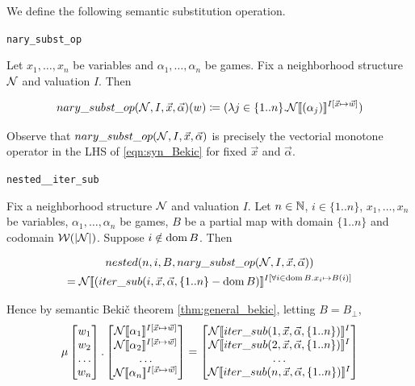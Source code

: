 We define the following semantic substitution operation.

\begin{bdefinition}
\texttt{nary\_subst\_op}

Let $x_1,\dots,x_n$ be variables and $\alpha_1,\dots,\alpha_n$ be \rlGL{} games. Fix a neighborhood structure $\mathcal N$ and valuation $I$. Then

    \[nary\_subst\_op(\mathcal N,I,\vec{x},\vec{\alpha})(w) \coloneq (\lambda j\in\{1..n\}. \mathcal N[\![(\alpha_j)]\!]^{I[\vec{x}\mapsto \vec{w}]})\]
\end{bdefinition}

Observe that $nary\_subst\_op(\mathcal N,I,\vec{x},\vec{\alpha})$ is precisely the vectorial monotone operator in the LHS of \autoref{eqn:syn_Bekic} for fixed $\vec{x}$ and $\vec{\alpha}$.


\begin{btheorem}
\label{thm:nested__iter_sub}
\texttt{nested\_\_iter\_sub}

Fix a neighborhood structure $\mathcal N$ and valuation $I$. Let $n\in \mathbb{N}$, $i\in\{1..n\}$, $x_1,\dots,x_n$ be variables, $\alpha_1,\dots,\alpha_n$ be \rlGL{} games, $B$ be a partial map with domain $\{1..n\}$ and codomain $\mathcal W(|\mathcal N|)$. Suppose $i\notin \operatorname{dom} B$. Then

\begin{multline}
    nested (n,i,B,nary\_subst\_op(\mathcal N,I,\vec{x},\vec{\alpha})) \\
 = \mathcal N [\![(iter\_sub(i,\vec{x},\vec{\alpha},\{1..n\}-\operatorname{dom} B)]\!]^{I[\forall i \in \operatorname{dom} B. x_i\mapsto B(i) ]}
\end{multline}

Hence by semantic Beki\v{c} theorem \autoref{thm:general_bekic}, letting $B=B_\bot$,
\begin{equation}
    \label{eqn:syn_Bekic}
    \mu \begin{bmatrix}
    w_1 \\ w_2 \\ \dots  \\ w_n
\end{bmatrix}. \begin{bmatrix}
    \N\ddl\alpha_1\ddr^{I[\vec{x}\mapsto \vec{w}]} \\ \N\ddl\alpha_2\ddr^{I[\vec{x}\mapsto \vec{w}]} \\
    \dots \\
    \N\ddl\alpha_n\ddr^{I[\vec{x}\mapsto \vec{w}]}
\end{bmatrix} = \begin{bmatrix}
    \N\ddl iter\_sub (1, \vec{x}, \vec{\alpha}, \{1..n\})\ddr^{I} \\ 
    \N\ddl iter\_sub (2, \vec{x}, \vec{\alpha}, \{1..n\})\ddr^{I} \\
    \dots \\
    \N\ddl iter\_sub (n, \vec{x}, \vec{\alpha}, \{1..n\})\ddr^{I}
\end{bmatrix}
\end{equation}
    
\end{btheorem}

